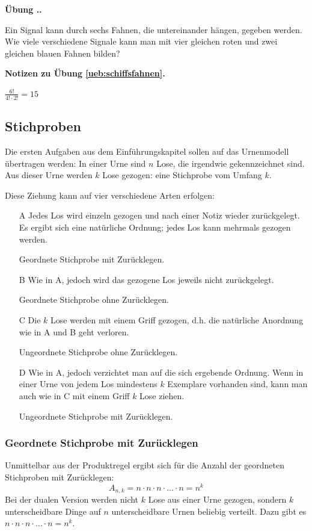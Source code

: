 \documentclass[%
11pt,%
twoside,%
titlepage,%
german,%
headsepline%
]{scrartcl}
\newcommand{\faEyeLightGray}{\textcolor{lightgray}{\faEye}} %
\newcommand{\concatueb}[1]{ueb:#1}%
\newcommand{\concatlsg}[1]{lsg:#1}%
\newcounter{uebcounter}[section]
\renewcommand{\theuebcounter}{\thesection.\arabic{uebcounter}}  %
\newenvironment{lsg}[1]{%
    \par\noindent\textbf{Notizen zu Übung \ref{\concatueb{#1}}.}%
    \label{\concatlsg{#1}}
}{%
    \par%
}
\newenvironment{uebenv}[1]{%
    \refstepcounter{uebcounter}
    \par\noindent\textbf{Übung \theuebcounter.}%
    \label{\concatueb{#1}}\hfill\hyperref[\concatlsg{#1}]{\faEyeLightGray}\par
}{%
    \par
}
\newcommand{\definition}[1]{\colorbox{emerald}{#1}}
\begin{document}
\begin{uebenv}{schiffsfahnen}
Ein Signal kann durch sechs Fahnen, die untereinander hängen, gegeben werden. Wie viele verschiedene Signale kann man mit vier gleichen roten und zwei gleichen blauen Fahnen bilden?
\end{uebenv}

\begin{lsg}{schiffsfahnen}
$\frac{6!}{4!\cdot 2!}=15$
\end{lsg}


\subsection{Stichproben}
Die ersten Aufgaben aus dem Einführungskapitel sollen auf das Urnenmodell übertragen werden: In einer Urne sind $n$ Lose, die irgendwie gekennzeichnet sind. Aus dieser Urne werden $k$ Lose gezogen: eine \definition{Stichprobe} vom Umfang $k$.

Diese Ziehung kann auf vier verschiedene Arten erfolgen:
\begin{itemize}
\item[A] Jedes Los wird einzeln gezogen und nach einer Notiz wieder zurückgelegt. Es ergibt sich eine natürliche Ordnung; jedes Los kann mehrmals gezogen werden.

\definition{Geordnete Stichprobe mit Zurücklegen}.
\item[B]  Wie in A, jedoch wird das gezogene Los jeweils nicht zurückgelegt.

\definition{Geordnete Stichprobe ohne Zurücklegen}.
\item[C] Die $k$ Lose werden mit einem Griff gezogen, d.h. die natürliche Anordnung wie in A und B geht verloren.

\definition{Ungeordnete Stichprobe ohne Zurücklegen}.
\item[D] Wie in A, jedoch verzichtet man auf die sich ergebende Ordnung. Wenn in einer Urne von jedem Los mindestens $k$ Exemplare vorhanden sind, kann man auch wie in C mit einem Griff $k$ Lose ziehen.

\definition{Ungeordnete Stichprobe mit Zurücklegen}.
\end{itemize}

\subsubsection{Geordnete Stichprobe mit Zurücklegen}
Unmittelbar aus der Produktregel ergibt sich für die Anzahl der geordneten Stichproben mit Zurücklegen:
$$A_{n,k} = n\cdot n\cdot n\cdot\dots\cdot n=n^k$$
Bei der dualen Version werden nicht $k$ Lose aus einer Urne gezogen, sondern $k$ unterscheidbare Dinge auf $n$ unterscheidbare Urnen beliebig verteilt. Dazu gibt es $n\cdot n\cdot n\cdot\dots\cdot n=n^k$.
\end{document}
